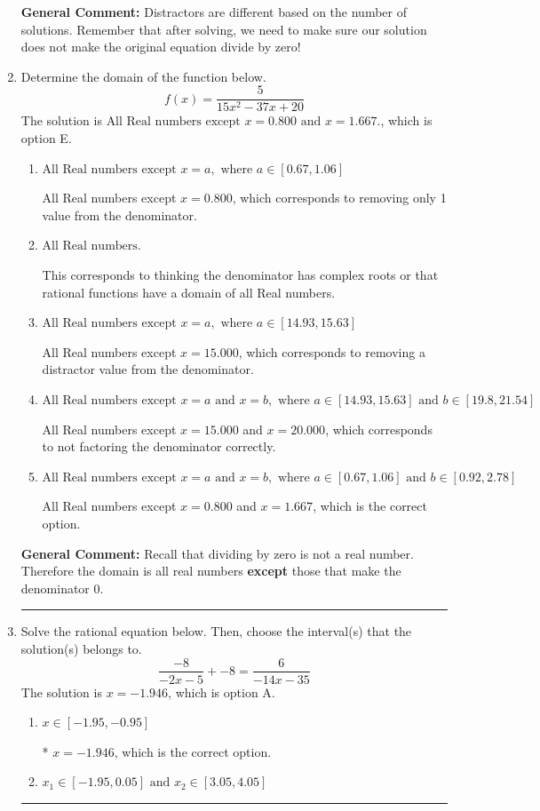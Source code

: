 \documentclass{extbook}[14pt]
\newcommand{\litem}[1]{\item #1

\rule{\textwidth}{0.4pt}}
\begin{document}
\begin{enumerate}
{\textbf{General Comment:} Distractors are different based on the number of solutions. Remember that after solving, we need to make sure our solution does not make the original equation divide by zero!
}
\litem{
Determine the domain of the function below.
\[ f(x) = \frac{5}{15x^{2} -37 x + 20} \]The solution is \( \text{All Real numbers except } x = 0.800 \text{ and } x = 1.667. \), which is option E.\begin{enumerate}[label=\Alph*.]
\item \( \text{All Real numbers except } x = a, \text{ where } a \in [0.67, 1.06] \)

All Real numbers except $x = 0.800$, which corresponds to removing only 1 value from the denominator.
\item \( \text{All Real numbers.} \)

This corresponds to thinking the denominator has complex roots or that rational functions have a domain of all Real numbers.
\item \( \text{All Real numbers except } x = a, \text{ where } a \in [14.93, 15.63] \)

All Real numbers except $x = 15.000$, which corresponds to removing a distractor value from the denominator.
\item \( \text{All Real numbers except } x = a \text{ and } x = b, \text{ where } a \in [14.93, 15.63] \text{ and } b \in [19.8, 21.54] \)

All Real numbers except $x = 15.000$ and $x = 20.000$, which corresponds to not factoring the denominator correctly.
\item \( \text{All Real numbers except } x = a \text{ and } x = b, \text{ where } a \in [0.67, 1.06] \text{ and } b \in [0.92, 2.78] \)

All Real numbers except $x = 0.800$ and $x = 1.667$, which is the correct option.
\end{enumerate}

\textbf{General Comment:} Recall that dividing by zero is not a real number. Therefore the domain is all real numbers \textbf{except} those that make the denominator 0.
}
\litem{
Solve the rational equation below. Then, choose the interval(s) that the solution(s) belongs to.
\[ \frac{-8}{-2x -5} + -8 = \frac{6}{-14x -35} \]The solution is \( x = -1.946 \), which is option A.\begin{enumerate}[label=\Alph*.]
\item \( x \in [-1.95,-0.95] \)

* $x = -1.946$, which is the correct option.
\item \( x_1 \in [-1.95, 0.05] \text{ and } x_2 \in [3.05,4.05] \)


\end{enumerate}}
\end{enumerate}
\end{document}
